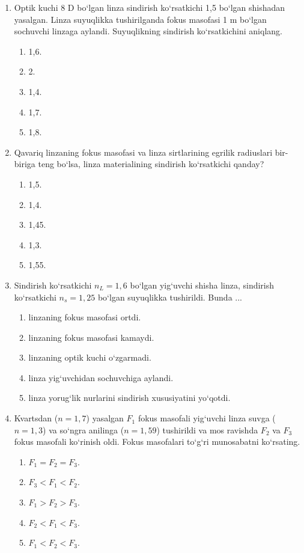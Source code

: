 \begin{enumerate}
\item Optik kuchi 8 D bo‘lgan linza sindirish ko‘rsatkichi 1,5 bo‘lgan shishadan yasalgan. Linza suyuqlikka tushirilganda fokus masofasi 1 m bo‘lgan sochuvchi linzaga aylandi. Suyuqlikning sindirish ko‘rsatkichini aniqlang.
\begin{enumerate}[label=\Alph*)]
\item 1,6.
\item 2.
\item 1,4.
\item 1,7.
\item 1,8.
\end{enumerate}

\item Qavariq linzaning fokus masofasi va linza sirtlarining egrilik radiuslari bir-biriga teng bo‘lsa, linza materialining sindirish ko‘rsatkichi qanday?
\begin{enumerate}[label=\Alph*)]
\item 1,5.
\item 1,4.
\item 1,45.
\item 1,3.
\item 1,55.
\end{enumerate}

\item Sindirish ko‘rsatkichi $n_L=1,6$ bo‘lgan yig‘uvchi shisha linza, sindirish ko‘rsatkichi $n_s=1,25$ bo‘lgan suyuqlikka tushirildi. Bunda ...
\begin{enumerate}[label=\Alph*)]
\item linzaning fokus masofasi ortdi.
\item linzaning fokus masofasi kamaydi.
\item linzaning optik kuchi o‘zgarmadi.
\item linza yig‘uvchidan sochuvchiga aylandi.
\item linza yorug‘lik nurlarini sindirish xususiyatini yo‘qotdi.
\end{enumerate}

\item Kvartsdan ($n=1,7$) yasalgan $F_1$ fokus masofali yig‘uvchi linza suvga ($n=1,3$) va so‘ngra anilinga ($n=1,59$) tushirildi va mos ravishda $F_2$ va $F_3$ fokus masofali ko‘rinish oldi. Fokus masofalari to‘g‘ri munosabatni ko‘rsating.
\begin{enumerate}[label=\Alph*)]
\item $F_1=F_2=F_3$.
\item $F_3<F_1<F_2$.
\item $F_1>F_2>F_3$.
\item $F_2<F_1<F_3$.
\item $F_1<F_2<F_3$.
\end{enumerate}


\end{enumerate}
